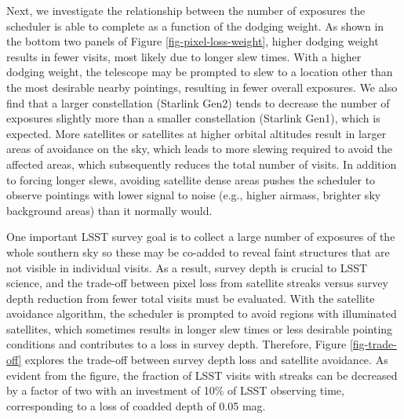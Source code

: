 \documentclass[twocolumn]{aastex631}
\begin{document}
\begin{figure*}[ht!]
\caption{Illustration of changes in the mean streak length in all visits including those with no streak (top left), the fraction of visits with streaks
(top right), the number of acquired visits in year 1 (bottom left) and coadded depth in the $g$ band (bottom right) as a function of dodging basis function weight (starting with essentially no dodging on the left). 
Note that to reduce the fraction of visits with streaks by about a factor of two, satellite avoidance will require 10\% of total observing time.
\vspace{3em}
\label{fig-pixel-loss-weight}}
\end{figure*}

Next, we investigate the relationship between the number of exposures the scheduler is able to complete as a function of the dodging weight. As shown in the bottom two panels of Figure \ref{fig-pixel-loss-weight}, higher dodging weight results in fewer visits, most likely due to longer slew times. With a higher dodging weight, the telescope may be prompted to slew to a location other than the most desirable nearby pointings, resulting in fewer overall exposures. We also find that a larger constellation (Starlink Gen2) tends to decrease the number of exposures slightly more than a smaller constellation (Starlink Gen1), which is expected. More satellites or satellites at higher orbital altitudes result in larger areas of avoidance on the sky, which leads to more slewing required to avoid the affected areas, which subsequently reduces the total number of visits. In addition to forcing longer slews, avoiding satellite dense areas pushes the scheduler to observe pointings with lower signal to noise (e.g., higher airmass, brighter sky background areas) than it normally would.

One important LSST survey goal is to collect a large number of exposures of the whole southern sky so these may be co-added to reveal faint structures that are not visible in individual visits. As a result, survey depth is crucial to LSST science, and the trade-off between pixel loss from satellite streaks versus survey depth reduction from fewer total visits must be evaluated. With the satellite avoidance algorithm, the scheduler is prompted to avoid regions with illuminated satellites, which sometimes results in longer slew times or less desirable pointing conditions and contributes to a loss in survey depth. Therefore, Figure \ref{fig-trade-off} explores the trade-off between survey depth loss and satellite avoidance. As evident
from the figure, the fraction of LSST visits with streaks can be decreased by a factor of two with 
an investment of 10\% of LSST observing time, corresponding to a loss of coadded depth of 0.05 mag. 
\end{document}
